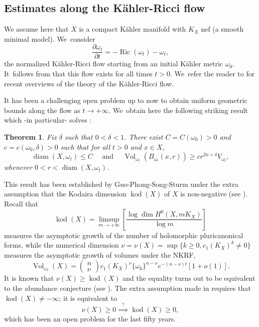 \documentclass[JEP,XML,SOM,Unicode,published]{cedram}
\DeclareMathOperator{\diam}{diam}
\DeclareMathOperator{\kod}{kod}
\DeclareMathOperator{\Ric}{Ric}
\DeclareMathOperator{\Vol}{Vol}
\newtheorem{theorem}{Theorem}[section]
\theoremstyle{definition}
\begin{document}
\subsection{Estimates along the Kähler-Ricci flow} \label{sec:krf}

We assume here that $X$ is a compact Kähler manifold with $K_X$ nef (a smooth minimal model). We~consider
\[
\frac{\partial \omega_t}{\partial t}=-\Ric(\omega_t)-\omega_t,
\]
the normalized Kähler-Ricci flow starting from an initial Kähler metric $\omega_0$. It~follows from \cite{TZ06} that this flow exists for all times $t>0$. We~refer the reader to \cite{Tos18,Tos24} for recent overviews of the theory of the Kähler-Ricci flow.

It has been
a challenging open problem up to now to obtain uniform geometric bounds along the flow as $t \rightarrow +\infty$. We~obtain here the following striking result which -in particular- solves \cite[Conj.\,6.2]{Tos18}:

\begin{theorem} \label{thm:fkr}
Fix $\delta$ such that $0<\delta<1$.
There exist $C=C(\omega_0)>0$ and $c=c(\omega_0,\delta)>0$ such that for all $t>0$ and $x \in X$,
\[
\diam(X,\omega_t) \leq C
\quad \text{ and } \quad
\Vol_{\omega_t}(B_{\omega_t}(x,r)) \geq c r^{2n+\delta} V_{\omega_t},
\]
whenever $0<r<\diam(X,\omega_t)$.
\end{theorem}

This result has been established by Guo-Phong-Song-Sturm under the extra assumption that
the Kodaira dimension $\kod(X)$ of $X$ is non-negative (see \cite[Th.\,2.3]{GPSS22}).
Recall that
\[
\kod(X)=\limsup_{m \rightarrow+\infty} \left[ \frac{\log \dim H^0(X,mK_X)}{\log m} \right]
\]
measures the asymptotic growth of the number of holomorphic pluricanonical forms,
while the numerical dimension
$\nu=\nu(X)=\sup \{ k \geq 0, c_1(K_X)^k \neq 0 \}$
measures the asymptotic growth of volumes under the NKRF,
\begin{equation} \label{eq:volfkrn}
\Vol_{\omega_t}(X)=
\begin{pmatrix} n \\ \nu \end{pmatrix}
c_1(K_X)^{\nu} \{\omega_0\}^{n-\nu} e^{-(n-\nu)t} [1+o(1)].
\end{equation}
It is known that $\nu(X) \geq \kod(X)$ and the equality turns out to be equivalent to the abundance conjecture
(see \cite[Conj.\,6.3]{Tos18}).
The extra assumption made in \cite[Th.\,2.3]{GPSS22} requires that $\kod(X) \neq -\infty$;
it is equivalent to
\[
\nu(X) \geq 0 \stackrel{?}{\implies} \kod(X) \geq 0,
\]
which has been an open problem for the last fifty years.
\end{document}
